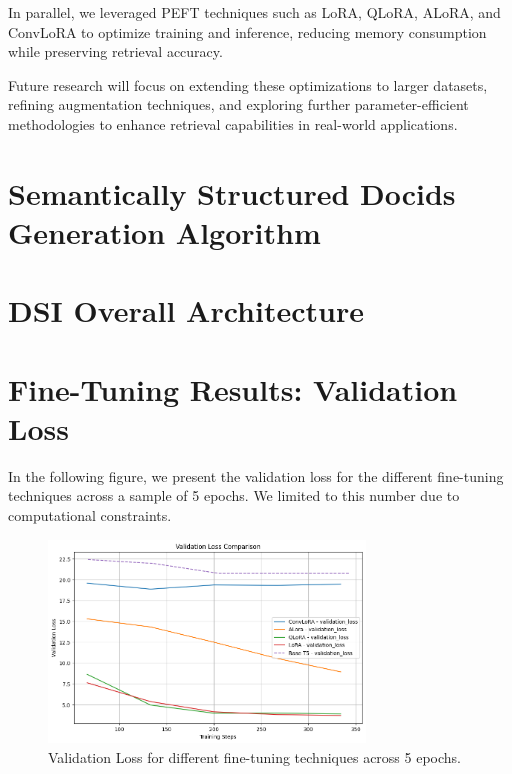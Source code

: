 \documentclass{article}
\begin{document}
In parallel, we leveraged PEFT techniques such as LoRA, QLoRA, ALoRA, and ConvLoRA to optimize training and inference, reducing memory consumption while preserving retrieval accuracy. 

Future research will focus on extending these optimizations to larger datasets, refining augmentation techniques, and exploring further parameter-efficient methodologies to enhance retrieval capabilities in real-world applications.




  
  

\appendix
\section{Semantically Structured Docids Generation Algorithm}
\label{sec:semanticids}


\section{DSI Overall Architecture}


\section{Fine-Tuning Results: Validation Loss}
\label{sec:metrics}
In the following figure, we present the validation loss for the different fine-tuning techniques across a sample of 5 epochs. We limited to this number due to computational constraints.
\begin{figure}
  \centering
  \includegraphics[width=0.75\textwidth]{figs/metrics.png}
  \caption{Validation Loss for different fine-tuning techniques across 5 epochs.}
  \label{fig:metrics}
\end{figure}
\end{document}
